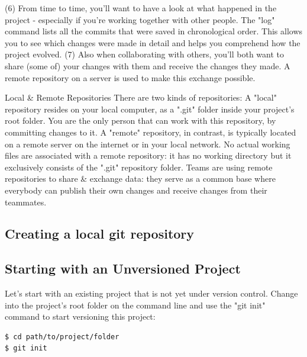 \documentclass{article}
\begin{document}
\newline\newline
(6) From time to time, you'll want to have a look at what happened in the project - especially if you're working together with other people. The "log" command lists all the commits that were saved in chronological order. This allows you to see which changes were made in detail and helps you comprehend how the project evolved.
\newline\newline
(7) Also when collaborating with others, you'll both want to share (some of) your changes with them and receive the changes they made. A remote repository on a server is used to make this exchange possible.

\begin{definition}

 Local \& Remote Repositories\newline\newline
 There are two kinds of repositories:
\newline
A "local" repository resides on your local computer, as a ".git" folder inside your project's root folder. You are the only person that can work with this repository, by committing changes to it.
A "remote" repository, in contrast, is typically located on a remote server on the internet or in your local network. No actual working files are associated with a remote repository: it has no working directory but it exclusively consists of the ".git" repository folder. Teams are using remote repositories to share \& exchange data: they serve as a common base where everybody can publish their own changes and receive changes from their teammates.
\end{definition}

\subsection{Creating a local git repository}
\subsection{Starting with an Unversioned Project}

Let's start with an existing project that is not yet under version control. Change into the project's root folder on the command line and use the "git init" command to start versioning this project:

\begin{lstlisting}[language=bash]
$ cd path/to/project/folder
$ git init
\end{lstlisting}
\end{document}
